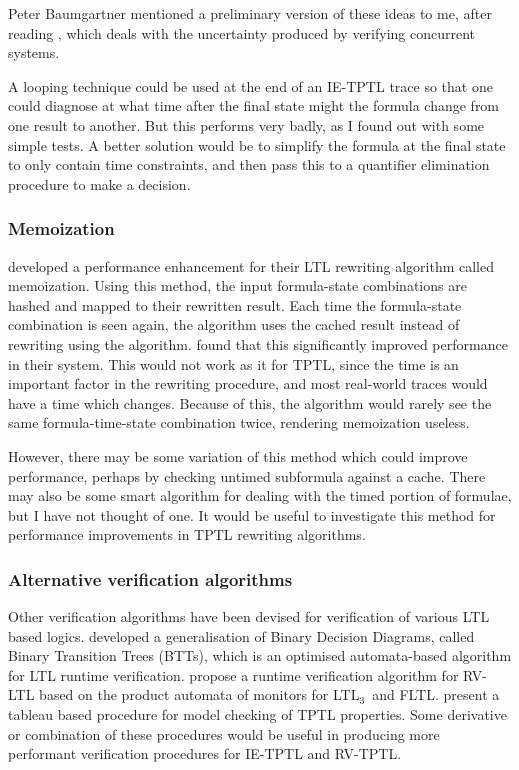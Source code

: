 \documentclass[a4paper]{article}
\newcommand{\ltlt}{LTL$_3$}
\begin{document}
Peter Baumgartner mentioned a preliminary version of these ideas to me, after reading \textcite{chai2014fivevalued}, which deals with the uncertainty produced by verifying concurrent systems.

A looping technique could be used at the end of an IE-TPTL trace so that one could diagnose at what time after the final state might the formula change from one result to another. But this performs very badly, as I found out with some simple tests. A better solution would be to simplify the formula at the final state to only contain time constraints, and then pass this to a quantifier elimination procedure to make a decision.

\subsubsection{Memoization}
\textcite[180]{rosu2005rewriting} developed a performance enhancement for their LTL rewriting algorithm called memoization. Using this method, the input formula-state combinations are hashed and mapped to their rewritten result. Each time the formula-state combination is seen again, the algorithm uses the cached result instead of rewriting using the algorithm. \citeauthor{rosu2005rewriting} found that this significantly improved performance in their system. This would not work as it for TPTL, since the time is an important factor in the rewriting procedure, and most real-world traces would have a time which changes. Because of this, the algorithm would rarely see the same formula-time-state combination twice, rendering memoization useless.

However, there may be some variation of this method which could improve performance, perhaps by checking untimed subformula against a cache. There may also be some smart algorithm for dealing with the timed portion of formulae, but I have not thought of one. It would be useful to investigate this method for performance improvements in TPTL rewriting algorithms.

\subsubsection{Alternative verification algorithms}
Other verification algorithms have been devised for verification of various LTL based logics. \textcite{rosu2005rewriting} developed a generalisation of Binary Decision Diagrams, called Binary Transition Trees (BTTs), which is an optimised automata-based algorithm for LTL runtime verification. \textcite{bauer2010comparing} propose a runtime verification algorithm for RV-LTL based on the product automata of monitors for \ltlt\ and FLTL. \textcite{alur1994really} present a tableau based procedure for model checking of TPTL properties.
Some derivative or combination of these procedures would be useful in producing more performant verification procedures for IE-TPTL and RV-TPTL.
\end{document}
